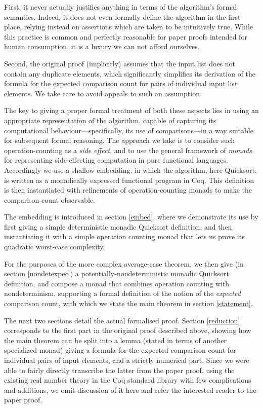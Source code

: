 \documentclass[runningheads]{llncs}
\begin{document}
First, it never actually justifies anything in terms of the algorithm's formal semantics. Indeed, it does not even formally define the algorithm in the first place, relying instead on assertions which are taken to be intuitively true. While this practice is common and perfectly reasonable for paper proofs intended for human consumption, it is a luxury we can not afford ourselves.

Second, the original proof (implicitly) assumes that the input list does not contain any duplicate elements, which significantly simplifies its derivation of the formula for the expected comparison count for pairs of individual input list elements. We take care to avoid appeals to such an assumption.

The key to giving a proper formal treatment of both these aspects lies in using an appropriate representation of the algorithm, capable of capturing its computational behaviour---specifically, its use of comparisons---in a way suitable for subsequent formal reasoning. 
The approach we take is to consider such operation-counting as a \emph{side effect}, and to use the general framework of \emph{monads} for representing side-effecting computation in pure functional languages. 
Accordingly we use a shallow embedding, in which the algorithm, here Quicksort, is written as a monadically expressed functional program in Coq. This definition is then instantiated with refinements of operation-counting monads to make the comparison count observable.

The embedding is introduced in section \ref{embed}, where we demonstrate its use by first giving a simple deterministic monadic Quicksort definition, and then instantiating it with a simple operation counting monad that lets us prove its quadratic worst-case complexity.

For the purposes of the more complex average-case theorem, we then give (in section \ref{nondetexpec}) a potentially-nondeterministic monadic Quicksort definition, and compose a monad that combines operation counting with nondeterminism, supporting a formal definition of the notion of the \emph{expected} comparison count, with which we state the main theorem in section \ref{statement}.

The next two sections detail the actual formalised proof. Section \ref{reduction} corresponds to the first part in the original proof described above, showing how the main theorem can be split into a lemma (stated in terms of another specialized monad) giving a formula for the expected comparison count for individual pairs of input elements, and a strictly numerical part. Since we were able to fairly directly transcribe the latter from the paper proof, using the existing real number theory in the Coq standard library with few complications and additions, we omit discussion of it here and refer the interested reader to the paper proof.
\end{document}
